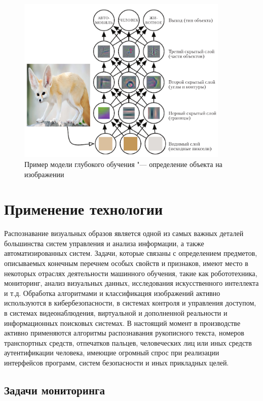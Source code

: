 \documentclass[bachelor, och, coursework]{SCWorks}
\begin{document}
        \begin{figure}[H]
            \centering
            \includegraphics[width=0.9\textwidth]{pic/1.png}
            \caption{Пример модели глубокого обучения "--- определение объекта на изображении}
            \label{fig:img1}
        \end{figure}

        
\section{Применение технологии}

    Распознавание визуальных образов является одной из самых важных
    деталей большинства систем управления и анализа информации, а также
    автоматизированных систем. Задачи, которые связаны с определением предметов,
    описываемых конечным перечнем особых свойств и признаков, имеют место в некоторых 
    отраслях деятельности машинного обучения, такие как робототехника, мониторинг, анализ
    визуальных данных, исследования искусственного интеллекта и т.д. Обработка алгоритмами и
    классификация изображений активно используются в кибербезопасности, в системах контроля и
    управления доступом, в системах видеонаблюдения, виртуальной и дополненной
    реальности и информационных поисковых системах. В настоящий момент в
    производстве активно применяются алгоритмы распознавания рукописного текста,
    номеров транспортных средств, отпечатков пальцев, человеческих лиц или иных средств аутентификации человека, имеющие огромный спрос при реализации интерфейсов программ, систем безопасности и иных прикладных целей.

    \subsection{Задачи мониторинга}
\end{document}
